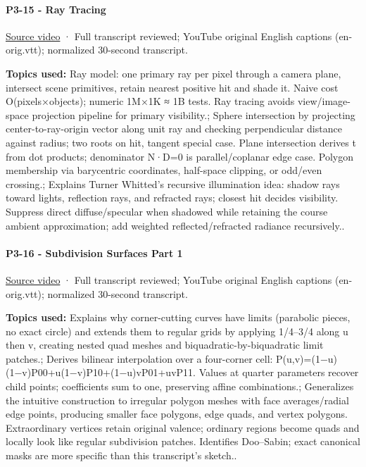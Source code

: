 \paragraph{P3-15 - Ray Tracing}\label{p3-15---ray-tracing}

\href{https://www.youtube.com/watch?v=Ahp6LDQnK4Y}{Source video} · Full transcript reviewed; YouTube original English captions (en-orig.vtt); normalized 30-second transcript.

\textbf{Topics used:} Ray model: one primary ray per pixel through a camera plane, intersect scene primitives, retain nearest positive hit and shade it. Naive cost O(pixels×objects); numeric 1M×1K ≈ 1B tests. Ray tracing avoids view/image-space projection pipeline for primary visibility.; Sphere intersection by projecting center-to-ray-origin vector along unit ray and checking perpendicular distance against radius; two roots on hit, tangent special case. Plane intersection derives t from dot products; denominator N·D=0 is parallel/coplanar edge case. Polygon membership via barycentric coordinates, half-space clipping, or odd/even crossing.; Explains Turner Whitted's recursive illumination idea: shadow rays toward lights, reflection rays, and refracted rays; closest hit decides visibility. Suppress direct diffuse/specular when shadowed while retaining the course ambient approximation; add weighted reflected/refracted radiance recursively..

\paragraph{P3-16 - Subdivision Surfaces Part 1}\label{p3-16---subdivision-surfaces-part-1}

\href{https://www.youtube.com/watch?v=9uscFr2Hht0}{Source video} · Full transcript reviewed; YouTube original English captions (en-orig.vtt); normalized 30-second transcript.

\textbf{Topics used:} Explains why corner-cutting curves have limits (parabolic pieces, no exact circle) and extends them to regular grids by applying 1/4--3/4 along u then v, creating nested quad meshes and biquadratic-by-biquadratic limit patches.; Derives bilinear interpolation over a four-corner cell: P(u,v)=(1−u)(1−v)P00+u(1−v)P10+(1−u)vP01+uvP11. Values at quarter parameters recover child points; coefficients sum to one, preserving affine combinations.; Generalizes the intuitive construction to irregular polygon meshes with face averages/radial edge points, producing smaller face polygons, edge quads, and vertex polygons. Extraordinary vertices retain original valence; ordinary regions become quads and locally look like regular subdivision patches. Identifies Doo--Sabin; exact canonical masks are more specific than this transcript's sketch..

